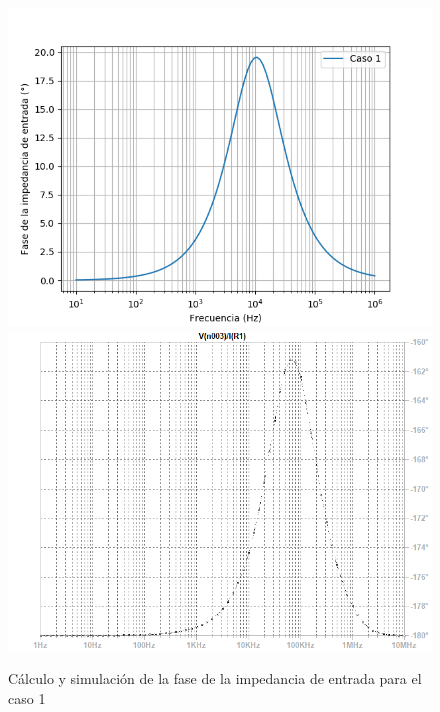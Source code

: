 \begin{figure}[H]
\begin{centering}
\includegraphics[scale=0.5]{../Ex1/iA/Resources1a/zinpp1}\includegraphics[scale=0.4]{../Ex1/iA/Resources1a/zinpp1_sim}
\par\end{centering}
\caption{Cálculo y simulación de la fase de la impedancia de entrada para el
caso 1}

\end{figure}

